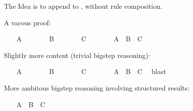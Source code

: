 \begin{isabellebody}
\begin{isamarkuptext}
\begin{itemize}
  \end{itemize}%
\end{isamarkuptext}%
\isamarkuptrue%
%
\isamarkuptrue%
%
\begin{isamarkuptext}%
The Idea is to append  to ,
  without rule composition.%
\end{isamarkuptext}%
\isamarkuptrue%
\isamarkupfalse%
\isanewline
{}%
\isadelimproof
%
\endisadelimproof
%
\isatagproof
%
\begin{isamarkuptxt}%
A vacous proof:%
\end{isamarkuptxt}%
\isamarkuptrue%
\ \ \isamarkupfalse%
\ A\ \isamarkupfalse%
\isanewline
\ \ \isamarkupfalse%
\isanewline
\ \ \isamarkupfalse%
\ B\ \isamarkupfalse%
\isanewline
\ \ \isamarkupfalse%
\isanewline
\ \ \isamarkupfalse%
\ C\ \isamarkupfalse%
\isanewline
\ \ \isamarkupfalse%
\isanewline
\ \ \isamarkupfalse%
\ A\ \ B\ \ C\ \isamarkupfalse%
\isanewline
{}\isamarkupfalse%
%
\begin{isamarkuptxt}%
Slightly more content (trivial bigstep reasoning):%
\end{isamarkuptxt}%
\isamarkuptrue%
\ \ \isamarkupfalse%
\ A\ \isamarkupfalse%
\isanewline
\ \ \isamarkupfalse%
\isanewline
\ \ \isamarkupfalse%
\ B\ \isamarkupfalse%
\isanewline
\ \ \isamarkupfalse%
\isanewline
\ \ \isamarkupfalse%
\ C\ \isamarkupfalse%
\isanewline
\ \ \isamarkupfalse%
\isanewline
\ \ \isamarkupfalse%
\ {}A\ {}\ B\ {}\ C{}\ \isamarkupfalse%
\ blast\isanewline
{}\isamarkupfalse%
%
\begin{isamarkuptxt}%
More ambitous bigstep reasoning involving structured results:%
\end{isamarkuptxt}%
\isamarkuptrue%
\ \ \isamarkupfalse%
\ {}A\ {}\ B\ {}\ C{}\ \isamarkupfalse%

\end{isabellebody}
